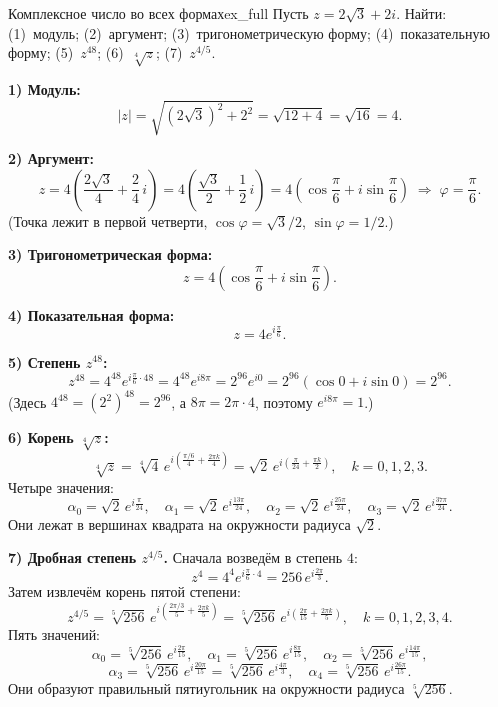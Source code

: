 \documentclass[12pt,a4paper]{article}
\begin{document}
\begin{definition}{Комплексное число во всех формах}{ex_full}
Пусть $z = 2\sqrt{3} + 2i$. Найти:
(1)~модуль; (2)~аргумент; (3)~тригонометрическую форму;
(4)~показательную форму; (5)~$z^{48}$; (6)~$\sqrt[4]{z}$;
(7)~$z^{4/5}$.

\textbf{1) Модуль:}
\[
|z| = \sqrt{\left(2\sqrt{3}\right)^2 + 2^2} = \sqrt{12 + 4}
= \sqrt{16} = 4.
\]

\textbf{2) Аргумент:}
\[
z = 4\!\left(\frac{2\sqrt{3}}{4} + \frac{2}{4}\,i\right)
= 4\!\left(\frac{\sqrt{3}}{2} + \frac{1}{2}\,i\right)
= 4\!\left(\cos\frac{\pi}{6} + i\sin\frac{\pi}{6}\right)
\;\Rightarrow\; \varphi = \frac{\pi}{6}.
\]
(Точка лежит в первой четверти, $\cos\varphi = \sqrt3/2$,
$\sin\varphi = 1/2$.)

\textbf{3) Тригонометрическая форма:}
\[
z = 4\!\left(\cos\frac{\pi}{6} + i\sin\frac{\pi}{6}\right).
\]

\textbf{4) Показательная форма:}
\[
z = 4e^{i\frac{\pi}{6}}.
\]

\textbf{5) Степень $z^{48}$:}
\[
z^{48} = 4^{48} e^{i\frac{\pi}{6}\cdot 48}
= 4^{48} e^{i8\pi} = 2^{96} e^{i0}
= 2^{96}(\cos 0 + i\sin 0) = 2^{96}.
\]
(Здесь $4^{48} = (2^2)^{48} = 2^{96}$, а $8\pi = 2\pi\cdot 4$, поэтому
$e^{i8\pi} = 1$.)

\textbf{6) Корень $\sqrt[4]{z}$:}
\[
\sqrt[4]{z} = \sqrt[4]{4}\,
e^{i\left(\frac{\pi/6}{4} + \frac{2\pi k}{4}\right)}
= \sqrt{2}\,e^{i\left(\frac{\pi}{24} + \frac{\pi k}{2}\right)},
\quad k = 0, 1, 2, 3.
\]
Четыре значения:
\[
\alpha_0 = \sqrt{2}\,e^{i\frac{\pi}{24}}, \quad
\alpha_1 = \sqrt{2}\,e^{i\frac{13\pi}{24}}, \quad
\alpha_2 = \sqrt{2}\,e^{i\frac{25\pi}{24}}, \quad
\alpha_3 = \sqrt{2}\,e^{i\frac{37\pi}{24}}.
\]
Они лежат в вершинах квадрата на окружности радиуса $\sqrt{2}$.

\textbf{7) Дробная степень $z^{4/5}$.} Сначала возведём в степень
$4$:
\[
z^4 = 4^4 e^{i\frac{\pi}{6}\cdot 4} = 256\, e^{i\frac{2\pi}{3}}.
\]
Затем извлечём корень пятой степени:
\[
z^{4/5} = \sqrt[5]{256}\,
e^{i\left(\frac{2\pi/3}{5} + \frac{2\pi k}{5}\right)}
= \sqrt[5]{256}\,
e^{i\left(\frac{2\pi}{15} + \frac{2\pi k}{5}\right)},
\quad k = 0, 1, 2, 3, 4.
\]
Пять значений:
\[
\alpha_0 = \sqrt[5]{256}\,e^{i\frac{2\pi}{15}}, \quad
\alpha_1 = \sqrt[5]{256}\,e^{i\frac{8\pi}{15}}, \quad
\alpha_2 = \sqrt[5]{256}\,e^{i\frac{14\pi}{15}},
\]
\[
\alpha_3 = \sqrt[5]{256}\,e^{i\frac{20\pi}{15}}
= \sqrt[5]{256}\,e^{i\frac{4\pi}{3}}, \quad
\alpha_4 = \sqrt[5]{256}\,e^{i\frac{26\pi}{15}}.
\]
Они образуют правильный пятиугольник на окружности радиуса
$\sqrt[5]{256}$.
\end{definition}
\end{document}
